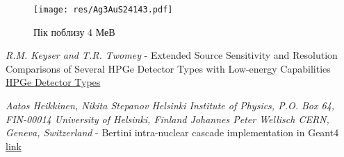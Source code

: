 \documentclass[a4paper, 14pt]{article}
\numberwithin{equation}{section}
\numberwithin{table}{section}
\begin{document}
	\begin{figure}[hbt!]
		\centering \texttt{[image: res/Ag3AuS24143.pdf]}
		\caption{Пік поблизу 4 МеВ}
		\label{ris:Ag3AuS24143}	
	\end{figure} 


\newpage	
\begin{thebibliography}{}
	
	 \textit{R.M. Keyser and T.R. Twomey} - Extended Source Sensitivity and Resolution Comparisons of Several HPGe Detector Types with Low-energy Capabilities \\
	\href{https://www.ortec-online.com/-/media/ametekortec/technical%20papers/high%20purity%20germanium%20detector%20applications%20and%20technology%20developements/extended-source-sensitivity-resolution-comparisons-several-hpge-detector-types-low-energy-capabilities.pdf?la=en}{ HPGe Detector Types}
		
	 \textit{Aatos Heikkinen, Nikita Stepanov Helsinki Institute of Physics, P.O. Box 64, FIN-00014 University of Helsinki, Finland Johannes Peter Wellisch CERN, Geneva, Switzerland} - Bertini intra-nuclear cascade implementation in Geant4
	\href{https://www.slac.stanford.edu/econf/C0303241/proc/papers/MOMT008.PDF}{link}
	
\end{thebibliography}
\end{document}
